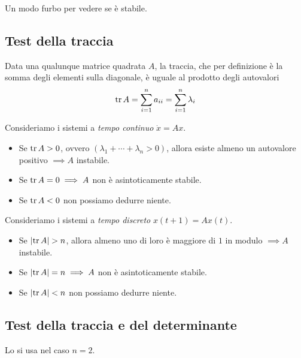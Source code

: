 Un modo furbo per vedere se è stabile.

\subsection{Test della traccia}

\begin{rem}
	Data una qualunque matrice quadrata $A$, la traccia, che per definizione è la somma degli elementi sulla diagonale, è uguale al prodotto degli autovalori
	\begin{equation*}
		\operatorname{tr} A=\sum\limits ^n_{i=1} a_{ii} =\sum\limits ^n_{i=1} \lambda _i
	\end{equation*}
\end{rem}

Consideriamo i sistemi a \textit{tempo continuo} $\dot{x} =Ax$.
\begin{itemize}
	\item Se $\operatorname{tr} A >0$, ovvero $\left(\lambda _1 +\cdots +\lambda _n  >0\right)$, allora esiste almeno un autovalore positivo $\implies A$ instabile.
	\item Se $\operatorname{tr} A=0\implies A$ non è asintoticamente stabile.
	\item Se $\operatorname{tr} A< 0$ non possiamo dedurre niente.
\end{itemize}

Consideriamo i sistemi a \textit{tempo discreto} $x\left(t+1\right) =Ax\left(t\right)$.
\begin{itemize}
	\item Se $\left| \operatorname{tr} A\right|  >n$, allora almeno uno di loro è maggiore di $1$ in modulo $\implies A$ instabile.
	\item Se $\left| \operatorname{tr} A\right| =n\implies A$ non è asintoticamente stabile.
	\item Se $\left| \operatorname{tr} A\right| < n$ non possiamo dedurre niente.
\end{itemize}

\subsection{Test della traccia e del determinante}

Lo si usa nel caso $n=2$.

